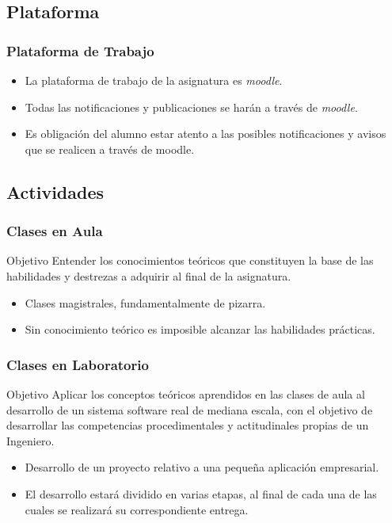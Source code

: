 \documentclass[a4paper,t,xcolor=pst,dvips,colortheme]{beamer}
\begin{document}
\subsection{Plataforma}

\begin{frame}[c]
	\frametitle{Plataforma de Trabajo}
	\begin{itemize}
		\item<1-> La plataforma de trabajo de la asignatura es \emph{moodle}.
		\item<2-> Todas las notificaciones y publicaciones se harán a través de \emph{moodle}.
		\item<3-> \alert{Es obligación del alumno estar atento a las posibles notificaciones y avisos que se realicen a través de moodle}.
	\end{itemize}
\end{frame}

\subsection{Actividades}

\begin{frame}
	\frametitle{Clases en Aula}
	\begin{block}{Objetivo}
        Entender los conocimientos teóricos que constituyen la base de las habilidades y destrezas a adquirir al final de la asignatura.
	\end{block}
    \begin{itemize}
        \item<2-> Clases magistrales, fundamentalmente de pizarra.
		\item<3-> Sin conocimiento teórico es imposible alcanzar las habilidades prácticas.
	\end{itemize}
\end{frame}

\begin{frame}
	\frametitle{Clases en Laboratorio}
	\begin{block}{Objetivo}
        Aplicar los conceptos teóricos aprendidos en las clases de aula al desarrollo de un sistema software real de mediana escala, con el objetivo de desarrollar las competencias procedimentales y actitudinales propias de un Ingeniero.
	\end{block}
	\begin{itemize}
        \item<2-> Desarrollo de un proyecto relativo a una pequeña aplicación empresarial.
        \item<3-> El desarrollo estará dividido en varias etapas, al final de cada una de las cuales se realizará su correspondiente entrega.
	\end{itemize}
\end{frame}
\end{document}
